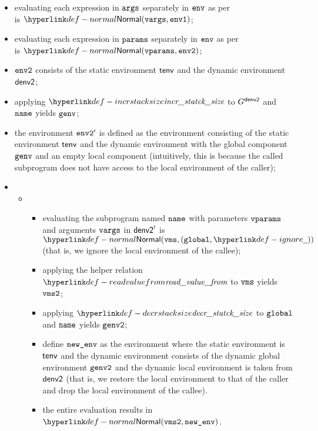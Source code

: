 \ProseParagraph
\AllApply
\begin{itemize}
  \item evaluating each expression in $\texttt{args}$ separately in $\texttt{env}$ as per \\
         is $\Normal(\vvargs, \envone)$\ProseOrAbnormal;
  \item evaluating each expression in $\texttt{params}$ separately in $\texttt{env}$ as per\\
         is $\Normal(\vvparams, \envtwo)$\ProseOrAbnormal;
  \item $\texttt{env2}$ consists of the static environment $\textsf{tenv}$ and the dynamic environment $\textsf{denv2}$;
  \item applying $\incrstacksize$ to $G^{\textsf{denv2}}$ and $\texttt{name}$ yields $\texttt{genv}$;
  \item the environment $\texttt{env2}'$ is defined as the environment
  consisting of the static environment $\textsf{tenv}$ and the dynamic environment with the global component
  $\texttt{genv}$ and an empty local component (intuitively, this is because the called subprogram does not have access
  to the local environment of the caller);
  \item \OneApplies
  \begin{itemize}
    \item {}
    \begin{itemize}
      \item evaluating the subprogram named $\texttt{name}$ with parameters $\texttt{vparams}$ and arguments $\texttt{vargs}$ in
      $\textsf{denv2}'$ is $\Normal(\vms, (\vglobal, \Ignore))$ (that is, we ignore the local environment
      of the callee)\ProseOrError;
      \item applying the helper relation $\readvaluefrom$ to $\texttt{vms}$ yields $\texttt{vms2}$;
      \item applying $\decrstacksize$ to $\texttt{global}$ and $\texttt{name}$ yields $\texttt{genv2}$;
      \item define $\texttt{new\_env}$ as the environment where the static environment is $\textsf{tenv}$ and the dynamic environment consists
            of the dynamic global environment $\texttt{genv2}$ and the dynamic local environment is taken from $\textsf{denv2}$
            (that is, we restore the local environment to that of the caller and drop the local environment of the callee).
      \item the entire evaluation results in $\Normal(\vmstwo, \newenv)$.
    \end{itemize}


\end{itemize}
\end{itemize}
